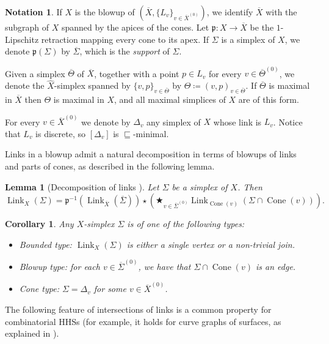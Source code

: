 \documentclass[svgnames]{amsart}
\theoremstyle{plain}
\newtheorem{lem}[thm]{Lemma}
\newtheorem{cor}[thm]{Corollary}
\theoremstyle{definition}
\newtheorem{notation}[thm]{Notation}
\newcommand{\nest}{\sqsubseteq}
\newcommand{\link}[2]{\operatorname{Link}_{#1}\left(#2\right)}
\newcommand{\p}{\mathfrak{p}}
\newcommand{\Cone}[1]{\operatorname{Cone}\left(#1\right)}
\renewcommand{\hat}{\widehat}
\newcommand{\ov}[1]{\overline{#1}}
\begin{document}
\begin{notation}
If $X$ is the blowup of $(\ov X, \{L_v\}_{v\in \ov X^{(0)}})$, we identify $\ov X$ with the subgraph of $X$ spanned by the apices of the cones. Let $\p\colon X\to \ov X$ be the $1$-Lipschitz retraction mapping every cone to its apex. If $\Sigma$ is a simplex of $X$, we denote $\p(\Sigma)$ by $\ov \Sigma$, which is the \emph{support} of $\Sigma$.

Given a simplex $\ov \Theta$ of $\ov X$, together with a point $p\in L_v$ for every $v\in \ov \Theta^{(0)}$, we denote the $\hat X$-simplex spanned by $\{v,p\}_{v\in \ov\Theta}$ by $\Theta\coloneq (v,p)_{v\in \ov\Theta}$. If $\ov\Theta$ is maximal in $\ov X$ then $\Theta$ is maximal in $X$, and all maximal simplices of $X$ are of this form.

For every $v\in \ov X^{(0)}$ we denote by $\Delta_v$ any simplex of $X$ whose link is $L_v$. Notice that $L_v$ is discrete, so $[\Delta_v]$ is $\nest$-minimal.
\end{notation}

Links in a blowup admit a natural decomposition in terms of blowups of links and parts of cones, as described in the following lemma.

\begin{lem}[{Decomposition of links \cite[Lemma 4.3]{converse}}]\label{lem:decomposition_of_links}
Let $\Sigma$ be a simplex of $X$. Then
$$\link{X}{\Sigma}=\p^{-1}\left(\link{\ov X}{\ov \Sigma}\right)\star \left(\bigstar_{v\in\ov\Sigma^{(0)}}\link{\Cone{v}}{\Sigma\cap\Cone{v}}\right).$$
\end{lem}
\begin{cor}\label{cor:bounded_links}
Any $X$-simplex $\Sigma$ is of one of the following types:
\begin{itemize}
 \item \label{cor:bounded_links1} \emph{Bounded type}: $\link{X}{\Sigma}$ is either a single vertex or a non-trivial join.
 \item \label{cor:bounded_links2} \emph{Blowup type}: for each $v\in \ov\Sigma^{(0)}$, we have that $\Sigma\cap \Cone{v}$ is an edge.
 \item \label{cor:bounded_links3} \emph{Cone type}: $\Sigma=\Delta_v$ for some $v\in \ov X^{(0)}$.
\end{itemize}
\end{cor}

\noindent The following feature of intersections of links is a common property for combinatorial HHSs (for example, it holds for curve graphs of surfaces, as explained in \cite[Remark 6.6]{BHMS}).
\end{document}
